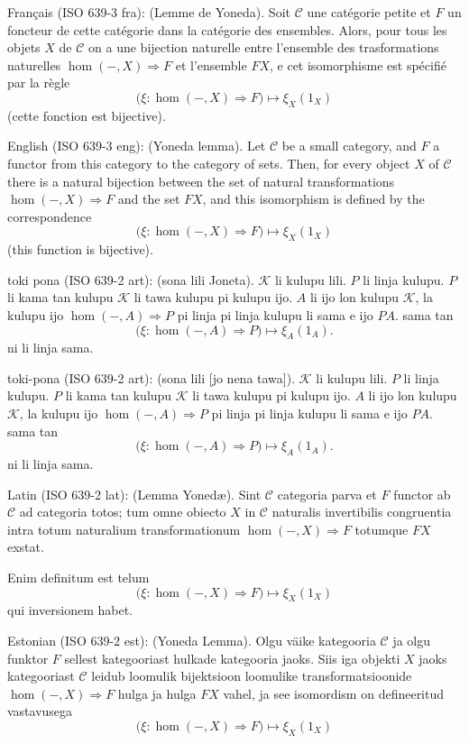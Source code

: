 \documentclass{article}
\newcommand{\tran}[3]{%
	\noindent\textsf{#1:} (#2). #3%
	\medskip\newline
}
\begin{document}
\tran{Français (ISO 639-3 fra)}{Lemme de Yoneda}{
	Soit $\mathcal C$ une catégorie petite et $F$ un foncteur de cette catégorie dans la catégorie des ensembles. Alors, pour tous les objets $X$ de $\mathcal C$ on a une bijection naturelle entre l'ensemble des trasformations naturelles $\hom(-,X)\Rightarrow F$ et l'ensemble $FX$, e cet isomorphisme est spécifié par la règle
	\[
		\Big(\xi : \hom(-,X)\Rightarrow F\Big) \mapsto \xi_X(1_X)
	\]
	(cette fonction est bijective).
}
\tran{English (ISO 639-3 eng)}{Yoneda lemma}{
Let $\mathcal C$ be a small category, and $F$ a functor from this category to the category of sets. Then, for every object $X$ of $\mathcal C$ there is a natural bijection between the set of natural transformations $\hom(-,X)\Rightarrow F$ and the set $FX$, and this isomorphism is defined by the correspondence
\[
	\Big(\xi : \hom(-,X)\Rightarrow F\Big) \mapsto \xi_X(1_X)
\]
(this function is bijective).
}
\tran{toki pona (ISO 639-2 art)}{sona lili Joneta}{$\mathcal K$ li kulupu lili. $P$ li linja kulupu. $P$ li kama tan kulupu $\mathcal K$ li tawa kulupu pi kulupu ijo. $A$ li ijo lon kulupu $\mathcal K$, la kulupu ijo $\hom(-,A) \Rightarrow P$ pi linja pi linja kulupu li sama e ijo $PA$. sama tan
\[
	\Big(\xi : \hom(-,A)\Rightarrow P\Big) \mapsto \xi_A(1_A).
\]
ni li linja sama.}
\tran{{\tp toki-pona} (ISO 639-2 art)}{{\tp sona lili [jo nena tawa]}}{{\tp $\mathcal K$ li kulupu lili. $P$ li linja kulupu. $P$ li kama tan kulupu $\mathcal K$ li tawa kulupu pi kulupu ijo. $A$ li ijo lon kulupu $\mathcal K$, la kulupu ijo $\hom(-,A) \Rightarrow P$ pi linja pi linja kulupu li sama e ijo $PA$. sama tan
\[
	\Big(\xi : \hom(-,A)\Rightarrow P\Big) \mapsto \xi_A(1_A).
\]
ni li linja sama.}}
\tran{Latin (ISO 639-2 lat)}{Lemma Yoned\ae}{
	Sint $\mathcal C$ categoria parva et $F$ functor ab $\mathcal C$ ad categoria totos; tum omne obiecto $X$ in $\mathcal C$ naturalis invertibilis congruentia intra totum naturalium transformationum $\hom(-,X)\Rightarrow F$ totumque $FX$ exstat.

	Enim definitum est telum
\[
	\Big(\xi : \hom(-,X)\Rightarrow F\Big) \mapsto \xi_X(1_X)
\]
qui inversionem habet.
}
\tran{Estonian (ISO 639-2 est)}{Yoneda Lemma}{
	Olgu väike kategooria $\mathcal C$ ja olgu funktor $F$ sellest kategooriast hulkade kategooria jaoks. Siis iga objekti $X$ jaoks kategooriast $\mathcal C$ leidub loomulik bijektsioon loomulike transformatsioonide $\hom(-,X)\Rightarrow F$ hulga ja hulga $FX$ vahel, ja see isomordism on defineeritud vastavusega
	\[
	\Big(\xi : \hom(-,X)\Rightarrow F\Big) \mapsto \xi_X(1_X)
\]
}
\end{document}
